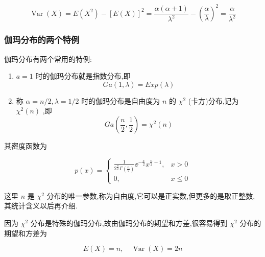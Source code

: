 \[
\operatorname{Var}(X)=E\left(X^{2}\right)-[E(X)]^{2}=\frac{\alpha(\alpha+1)}{\lambda^{2}}-\left(\frac{\alpha}{\lambda}\right)^{2}=\frac{\alpha}{\lambda^{2}}
\]

\subsubsection{伽玛分布的两个特例}

伽玛分布有两个常用的特例:

\begin{enumerate}
	\item $ a=1 $ 时的伽玛分布就是指数分布,即
	\begin{equation}
	G a(1, \lambda)=E x p(\lambda) \label{eq:2.5.13}
	\end{equation}
	\item 称 $ \alpha=n / 2, \lambda=1 / 2 $ 时的伽玛分布是自由度为 $ n $ 的 $ \chi^{2} $ (卡方)分布,记为 $ \chi^{2}(n) $ ,即
	\begin{equation}
	G a\left(\frac{n}{2}, \frac{1}{2}\right)=\chi^{2}(n) \label{eq:2.5.14}
	\end{equation}
\end{enumerate}

其密度函数为

\begin{equation}
p(x)=\left\{
\begin{array}{ll}
{\frac{1}{2^{\frac{\pi}{2}} \Gamma\left(\frac{n}{2}\right)} \ee ^{-\frac{x}{2}} x^{\frac{n}{2}-1},} & {x>0} \\ 
{0,} & {x \leqslant 0}
\end{array}
\right. \label{eq:2.5.15}
\end{equation}

这里 $ n $ 是 $ \chi^{2} $ 分布的唯一参数,称为自由度,它可以是正实数,但更多的是取正整数,其统计含义以后再介绍.

因为 $ \chi^{2} $ 分布是特殊的伽玛分布,故由伽玛分布的期望和方差,很容易得到 $ \chi^{2} $ 分布的期望和方差为

\[
E(X)=n, \quad \operatorname{Var}(X)=2 n
\]

